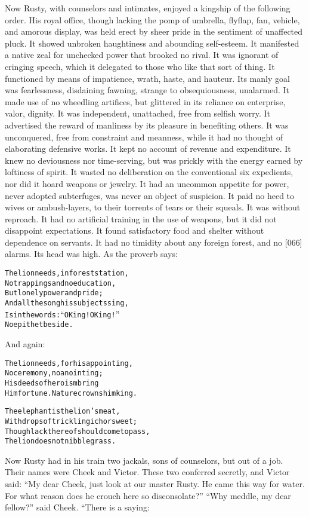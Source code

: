 \documentclass{article}
\renewenvironment{verbatim}{\begin{alltt}\normalfont\begin{centering}}{\end{centering}\end{alltt}}
\begin{document}
Now Rusty, with counselors and intimates, enjoyed a kingship of the
following order. His royal office, though lacking the pomp of
umbrella, flyflap, fan, vehicle, and amorous display, was held
erect by sheer pride in the sentiment of unaffected pluck. It
showed unbroken haughtiness and abounding self-esteem. It
manifested a native zeal for unchecked power that brooked no rival.
It was ignorant of cringing speech, which it delegated to those who
like that sort of thing. It functioned by means of impatience,
wrath, haste, and hauteur. Its manly goal was fearlessness,
disdaining fawning, strange to obsequiousness, unalarmed. It made
use of no wheedling artifices, but glittered in its reliance on
enterprise, valor, dignity. It was independent, unattached, free
from selfish worry. It advertised the reward of manliness by its
pleasure in benefiting others. It was unconquered, free from
constraint and meanness, while it had no thought of elaborating
defensive works. It kept no account of revenue and expenditure. It
knew no deviousness nor time-serving, but was prickly with the
energy earned by loftiness of spirit. It wasted no deliberation on
the conventional six expedients, nor did it hoard weapons or
jewelry. It had an uncommon appetite for power, never adopted
subterfuges, was never an object of suspicion. It paid no heed to
wives or ambush-layers, to their torrents of tears or their
squeals. It was without reproach. It had no artificial training in
the use of weapons, but it did not disappoint expectations. It
found satisfactory food and shelter without dependence on servants.
It had no timidity about any foreign forest, and no [066] alarms.
Its head was high. As the proverb says:

\begin{verbatim}
The lion needs, in forest station,
No trappings and no education,
    But lonely power and pride;
And all the song his subjects sing,
Is in the words: “O King! O King!”
    No epithet beside.
\end{verbatim}
And again:

\begin{verbatim}
The lion needs, for his appointing,
No ceremony, no anointing;
His deeds of heroism bring
Him fortune. Nature crowns him king.

The elephant is the lion's meat,
With drops of trickling ichor sweet;
Though lack thereof should come to pass,
The lion does not nibble grass.
\end{verbatim}
Now Rusty had in his train two jackals, sons of counselors, but out
of a job. Their names were Cheek and Victor. These two conferred
secretly, and Victor said:
``My dear Cheek, just look at our master Rusty. He came this way for water. For what reason does he crouch here so disconsolate?''
``Why meddle, my dear fellow?'' said Cheek. “There is a saying:
\end{document}
